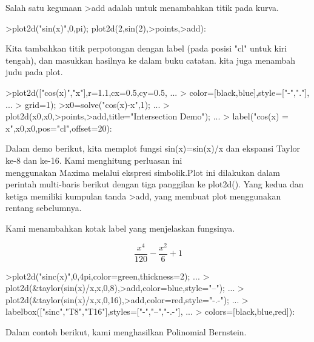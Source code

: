 \documentclass{article}
\begin{document}
\begin{eulernotebook}
\begin{eulercomment}
\begin{eulercomment}
\begin{eulercomment}
\begin{eulercomment}
\begin{eulercomment}
\begin{eulercomment}
\begin{eulercomment}
Salah satu kegunaan \textgreater{}add adalah untuk menambahkan titik pada kurva.
\end{eulercomment}
\begin{eulerprompt}
>plot2d("sin(x)",0,pi); plot2d(2,sin(2),>points,>add):
\end{eulerprompt}
\begin{eulercomment}
Kita  tambahkan  titik  perpotongan  dengan  label  (pada  posisi
"cl"  untuk  kiri  tengah),  dan  masukkan  hasilnya  ke  dalam  buku
catatan. kita juga menambah judu pada plot.
\end{eulercomment}
\begin{eulerprompt}
>plot2d(["cos(x)","x"],r=1.1,cx=0.5,cy=0.5, ...
>  color=[black,blue],style=["-","."], ...
>  grid=1);
>x0=solve("cos(x)-x",1);  ...
>  plot2d(x0,x0,>points,>add,title="Intersection Demo");  ...
>  label("cos(x) = x",x0,x0,pos="cl",offset=20):
\end{eulerprompt}
\begin{eulercomment}
Dalam  demo  berikut,  kita  memplot  fungsi  sin(x)=sin(x)/x  dan
ekspansi  Taylor  ke-8  dan  ke-16.  Kami  menghitung  perluasan  ini\\
menggunakan  Maxima  melalui  ekspresi  simbolik.Plot  ini  dilakukan
dalam  perintah  multi-baris  berikut  dengan  tiga  panggilan  ke
plot2d().  Yang  kedua  dan  ketiga  memiliki  kumpulan tanda  \textgreater{}add,
yang  membuat  plot  menggunakan  rentang  sebelumnya.

Kami  menambahkan  kotak  label  yang  menjelaskan  fungsinya.
\end{eulercomment}
\begin{eulerformula}
\[
\frac{x^4}{120}-\frac{x^2}{6}+1
\]
\end{eulerformula}
\begin{eulerprompt}
>plot2d("sinc(x)",0,4pi,color=green,thickness=2); ...
>  plot2d(&taylor(sin(x)/x,x,0,8),>add,color=blue,style="--"); ...
>  plot2d(&taylor(sin(x)/x,x,0,16),>add,color=red,style="-.-"); ...
>  labelbox(["sinc","T8","T16"],styles=["-","--","-.-"], ...
>    colors=[black,blue,red]):
\end{eulerprompt}
\begin{eulercomment}
Dalam  contoh  berikut,  kami  menghasilkan  Polinomial  Bernstein.


\end{eulercomment}
\end{eulercomment}
\end{eulercomment}
\end{eulercomment}
\end{eulercomment}
\end{eulercomment}
\end{eulercomment}
\end{eulernotebook}
\end{document}
